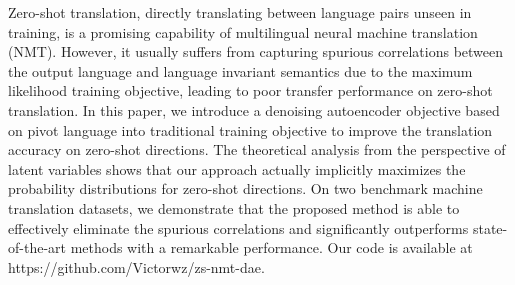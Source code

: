 Zero-shot translation, directly translating between language pairs unseen in training, is a promising capability of multilingual neural machine translation (NMT). However, it usually suffers from capturing spurious correlations between the output language and language invariant semantics due to the maximum likelihood training objective, leading to poor transfer performance on zero-shot translation. In this paper, we introduce a denoising autoencoder objective based on pivot language into traditional training objective to improve the translation accuracy on zero-shot directions. The theoretical analysis from the perspective of latent variables shows that our approach actually implicitly maximizes the probability distributions for zero-shot directions. On two benchmark machine translation datasets, we demonstrate that the proposed method is able to effectively eliminate the spurious correlations and significantly outperforms state-of-the-art methods with a remarkable performance. Our code is available at https://github.com/Victorwz/zs-nmt-dae.
